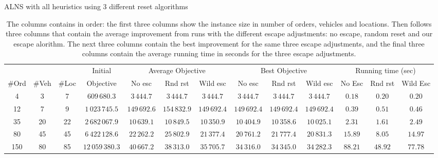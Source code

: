 \documentclass[../main.tex]{subfiles}
\begin{document}
\begin{table}
    \centering
    \caption{ALNS with all heuristics using 3 different reset algorithms}
    \begin{adjustbox}{width=\columnwidth,center}
            \begin{tabular}{|ccc|c|ccc|ccc|ccc|}
            \hline
                        &           &           & Initial           & \multicolumn{3}{c|}{Average Objective}         & \multicolumn{3}{c|}{Best Objective}            & \multicolumn{3}{c|}{Running time (sec)}   \\ 
                #Ord    & #Veh      & #Loc      & Objective         & No esc        & Rnd rst       & Wild esc      & No esc        & Rnd rst       & Wild esc      & No Esc    & Rnd rst & Wild Esc        \\
            \hline
                4       & 3         & 7         & $609\,680.3$     & $3\,444.7$   & $3\,444.7$   & $3\,444.7$   & $3\,444.7$   & $3\,444.7$   & $3\,444.7$   & $0.18$    & $0.20$    & $0.20$        \\
                12      & 7         & 9         & $1\,023\,745.5$  & $149\,692.6$ & $154\,832.9$ & $149\,692.4$ & $149\,692.4$ & $149\,692.4$ & $149\,692.4$ & $0.39$    & $0.51$    & $0.46$        \\
                35      & 20        & 22        & $2\,682\,067.9$  & $10\,639.1$  & $10\,849.5$  & $10\,350.9$  & $10\,404.9$  & $10\,358.6$  & $10\,025.1$   & $2.31$    & $1.61$    & $2.49$        \\
                80      & 45        & 45        & $6\,422\,128.6$  & $22\,262.2$  & $25\,802.9$  & $21\,377.4$  & $20\,761.2$  & $21\,777.4$  & $20\,831.3$  & $15.89$   & $8.05$    & $14.97$       \\
                150     & 80        & 85        & $12\,059\,380.3$ & $40\,667.2$  & $38\,313.0$  & $35\,705.7$  & $34\,316.0$  & $34\,345.0$  & $34\,282.3$  & $88.21$   & $48.92$   & $77.78$      \\
            \hline
            \end{tabular}
    \label{tab:wildComp}
    \end{adjustbox}
    \caption*{The columns contains in order: the first three columns show the instance size in number of orders, vehicles and locations. 
    Then follows three columns that contain the average improvement from runs with the different escape adjustments: no escape, random reset and our escape alorithm. The next three columns contain the best improvement for the same three escape adjustments, and the final three columns contain the average running time in seconds for the three escape adjustments.}
\end{table}
\end{document}

